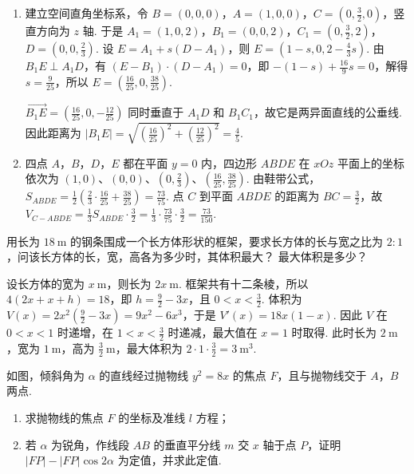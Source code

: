 \begin{solution}
\begin{enumerate}
\item 建立空间直角坐标系，令 \(B=(0,0,0)\)，\(A=(1,0,0)\)，\(C=\left(0,\frac32,0\right)\)，竖直方向为 \(z\) 轴. 于是 \(A_1=(1,0,2)\)，\(B_1=(0,0,2)\)，\(C_1=\left(0,\frac32,2\right)\)，\(D=\left(0,0,\frac23\right)\). 设 \(E=A_1+s(D-A_1)\)，则 \(E=\left(1-s,0,2-\frac43s\right)\). 由 \(B_1E\perp A_1D\)，有 \((E-B_1)\cdot(D-A_1)=0\)，即 \(-(1-s)+\frac{16}{9}s=0\)，解得 \(s=\frac9{25}\)，所以 \(E=\left(\frac{16}{25},0,\frac{38}{25}\right)\).

\(\overrightarrow{B_1E}=\left(\frac{16}{25},0,-\frac{12}{25}\right)\) 同时垂直于 \(A_1D\) 和 \(B_1C_1\)，故它是两异面直线的公垂线. 因此距离为 \(\lvert B_1E\rvert=\sqrt{\left(\frac{16}{25}\right)^2+\left(\frac{12}{25}\right)^2}=\frac45\).
\item 四点 \(A\)，\(B\)，\(D\)，\(E\) 都在平面 \(y=0\) 内，四边形 \(ABDE\) 在 \(xOz\) 平面上的坐标依次为 \((1,0)\)、\((0,0)\)、\((0,\frac23)\)、\((\frac{16}{25},\frac{38}{25})\). 由鞋带公式，\(S_{ABDE}=\frac12\left(\frac23\cdot\frac{16}{25}+\frac{38}{25}\right)=\frac{73}{75}\). 点 \(C\) 到平面 \(ABDE\) 的距离为 \(BC=\frac32\)，故 \(V_{C-ABDE}=\frac13S_{ABDE}\cdot\frac32=\frac13\cdot\frac{73}{75}\cdot\frac32=\frac{73}{150}\).
\end{enumerate}
\end{solution}

\begin{problem}
用长为 \(18 \mathrm{~m}\) 的钢条围成一个长方体形状的框架，要求长方体的长与宽之比为 \(2:1\)，问该长方体的长，宽，高各为多少时，其体积最大？ 最大体积是多少？
\end{problem}

\begin{solution}
设长方体的宽为 \(x\mathrm{~m}\)，则长为 \(2x\mathrm{~m}\). 框架共有十二条棱，所以 \(4(2x+x+h)=18\)，即 \(h=\frac92-3x\)，且 \(0<x<\frac32\). 体积为 \(V(x)=2x^2\left(\frac92-3x\right)=9x^2-6x^3\)，于是 \(V'(x)=18x(1-x)\). 因此 \(V\) 在 \(0<x<1\) 时递增，在 \(1<x<\frac32\) 时递减，最大值在 \(x=1\) 时取得. 此时长为 \(2\mathrm{~m}\)，宽为 \(1\mathrm{~m}\)，高为 \(\frac32\mathrm{~m}\)，最大体积为 \(2\cdot1\cdot\frac32=3\mathrm{~m}^3\).
\end{solution}

\begin{problem}
如图，倾斜角为 \(\alpha\) 的直线经过抛物线 \(y^{2} = 8x\) 的焦点 \(F\)，且与抛物线交于 \(A\)，\(B\) 两点.

\begin{enumerate}
\item 求抛物线的焦点 \(F\) 的坐标及准线 \(l\) 方程；
\item 若 \(\alpha\) 为锐角，作线段 \(AB\) 的垂直平分线 \(m\) 交 \(x\) 轴于点 \(P\)，证明 \(|FP| - |FP| \cos 2\alpha\) 为定值，并求此定值.
\end{enumerate}

\end{problem}

